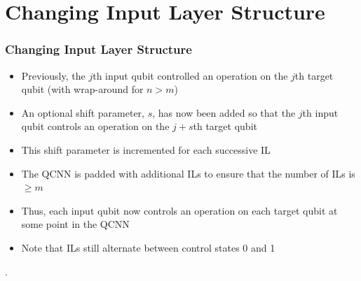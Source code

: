 \documentclass{beamer}
\begin{document}
\section{Changing Input Layer Structure}

\begin{frame}
\frametitle{Changing Input Layer Structure}
\begin{itemize}
\item Previously, the $j$th input qubit controlled an operation on the $j$th target qubit (with wrap-around for $n >m$) 
\item An optional \alert{shift parameter}, $s$, has now been added so that the $j$th input qubit controls an operation on the $j+s$th target qubit 
\item This shift parameter is incremented for each successive IL 
\item The QCNN is padded with additional ILs to ensure that the number of ILs is $\geq m$ 
\item Thus, \alert{each input qubit now controls an operation on each target qubit} at some point in the QCNN 
\item Note that ILs still alternate between control states 0 and 1
\end{itemize}.
\end{frame}
\end{document}
